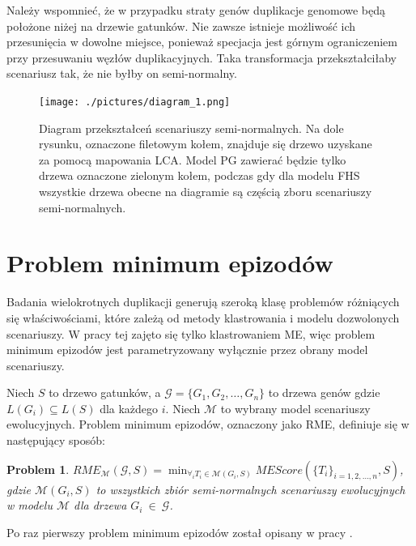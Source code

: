 \documentclass[licencjacka]{pracamgr}
\begin{document}
Należy wspomnieć, że w przypadku straty genów duplikacje genomowe będą położone niżej na drzewie gatunków. Nie zawsze istnieje możliwość ich przesunięcia w dowolne miejsce, ponieważ specjacja jest górnym ograniczeniem przy przesuwaniu węzłów duplikacyjnych. Taka transformacja przekształciłaby scenariusz tak, że nie byłby on semi-normalny.

\begin{figure}[H]\label{diagram_red}
  \centering
  \texttt{[image: ./pictures/diagram\_1.png]}
  \caption{Diagram przekształceń scenariuszy semi-normalnych. Na dole rysunku, oznaczone filetowym kołem, znajduje się drzewo uzyskane za pomocą mapowania LCA. Model PG zawierać będzie tylko drzewa oznaczone zielonym kołem, podczas gdy dla modelu FHS wszystkie drzewa obecne na diagramie są częścią zboru scenariuszy semi-normalnych.}
\end{figure}

\section{Problem minimum epizodów}

Badania wielokrotnych duplikacji generują szeroką klasę problemów różniących się właściwościami, które zależą od metody klastrowania i modelu dozwolonych scenariuszy. W pracy tej zajęto się tylko klastrowaniem ME, więc problem minimum epizodów jest parametryzowany wyłącznie przez obrany model scenariuszy. 

Niech $S$ to drzewo gatunków, a $\mathcal{G}=\{G_1,G_2, \dots , G_n\}$ to drzewa genów gdzie $L(G_i) \subseteq L(S)$ dla każdego $i$. Niech $\mathcal{M}$ to wybrany model scenariuszy ewolucyjnych. Problem minimum epizodów, oznaczony jako RME, definiuje się w następujący sposób:

\newtheorem{problem}{Problem}
\begin{problem}
  ${RME}_{\mathcal{M}}(\mathcal{G}, S) = \min_{\forall_i T_i \in \mathcal{M}(G_i,S)}MEScore(\lbrace T_i \rbrace_{i=1,2,\dots,n},S)$, gdzie $\mathcal{M}(G_i,S)$ to wszystkich zbiór semi-normalnych scenariuszy ewolucyjnych w modelu $\mathcal{M}$ dla drzewa $G_i~\in~\mathcal{G}$.
\end{problem}

Po raz pierwszy problem minimum epizodów został opisany w pracy \cite{guigo}.
\end{document}
